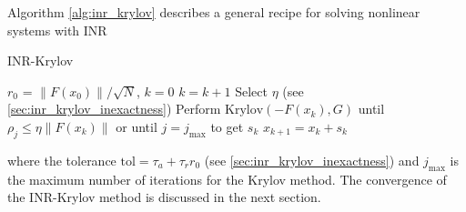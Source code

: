 Algorithm \ref{alg:inr_krylov} describes a general recipe for solving nonlinear systems with INR
\begin{algorithm}[H]
  \caption{INR-Krylov\cite[Algorithms 6.2.1 and 6.3.1]{nonlinear_cg_Kelley_1995}}
  \label{alg:inr_krylov}
  \begin{algorithmic}
    \State $r_0$ = $\|F(x_0)\|/\sqrt{N}$, $k=0$
    \State $k = k + 1$
    \State Select $\eta$ (see \cref{sec:inr_krylov_inexactness})
    \State Perform $\text{Krylov}(-F(x_k), G)$ until $\rho_j \leq \eta \|F(x_k)\|$ or until $j=j_{\text{max}}$ to get $s_k$
    \State $x_{k+1} = x_k + s_k$
    \EndWhile
  \end{algorithmic}
\end{algorithm}
where the tolerance $\text{tol} = \tau_a + \tau_r r_0$ (see \cref{sec:inr_krylov_inexactness}) and $j_{\text{max}}$ is the maximum number of iterations for the Krylov method. The convergence of the INR-Krylov method is discussed in the next section.

